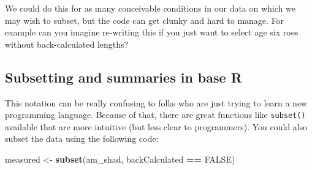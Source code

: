 \documentclass[
]{book}
\newenvironment{Shaded}{\begin{snugshade}}{\end{snugshade}}
\newcommand{\CommentTok}[1]{\textcolor[rgb]{0.56,0.35,0.01}{\textit{#1}}}
\newcommand{\DecValTok}[1]{\textcolor[rgb]{0.00,0.00,0.81}{#1}}
\newcommand{\KeywordTok}[1]{\textcolor[rgb]{0.13,0.29,0.53}{\textbf{#1}}}
\newcommand{\NormalTok}[1]{#1}
\newcommand{\OperatorTok}[1]{\textcolor[rgb]{0.81,0.36,0.00}{\textbf{#1}}}
\newcommand{\OtherTok}[1]{\textcolor[rgb]{0.56,0.35,0.01}{#1}}
\newcommand{\StringTok}[1]{\textcolor[rgb]{0.31,0.60,0.02}{#1}}
\begin{document}
\begin{Shaded}
\end{Shaded}

We could do this for as many conceivable conditions in our data on which we may wish to subset, but the code can get clunky and hard to manage. For example can you imagine re-writing this if you just want to select age six roes without back-calculated lengths?

\begin{Shaded}
\end{Shaded}

\hypertarget{subsetting-and-summaries-in-base-r}{%
\subsection{Subsetting and summaries in base R}\label{subsetting-and-summaries-in-base-r}}

This notation can be really confusing to folks who are just trying to learn a new programming language. Because of that, there are great functions like \texttt{subset()} available that are more intuitive (but less clear to programmers). You could also subset the data using the following code:

\begin{Shaded}
\begin{Highlighting}[]
\NormalTok{measured <-}\StringTok{ }\KeywordTok{subset}\NormalTok{(am_shad, backCalculated }\OperatorTok{==}\StringTok{ }\OtherTok{FALSE}\NormalTok{)}
\end{Highlighting}
\end{Shaded}
\end{document}
